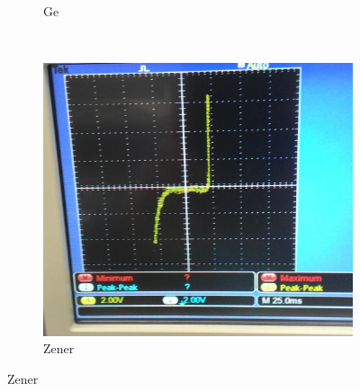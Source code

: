 \documentclass[12pt, a4paper]{article}
\begin{document}
\begin{figure}[H]
\begin{subfigure}[b]{0.45\textwidth}
    \caption{Ge}
  \end{subfigure}
  ~
  \begin{subfigure}[b]{0.5\textwidth}
    \includegraphics[width=1\textwidth]{img/P3.jpg}
    \caption{Zener}
  \end{subfigure}
\end{figure}
\end{document}
